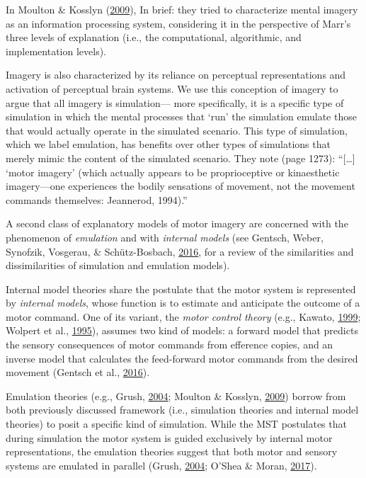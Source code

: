 \documentclass[a4paper,12pt,twoside,openright,oldfontcommands]{memoir}
\begin{document}
In Moulton \& Kosslyn
(\protect\hyperlink{ref-moulton_imagining_2009}{2009}), In brief: they
tried to characterize mental imagery as an information processing
system, considering it in the perspective of Marr's three levels of
explanation (i.e., the computational, algorithmic, and implementation
levels).

Imagery is also characterized by its reliance on perceptual
representations and activation of perceptual brain systems. We use this
conception of imagery to argue that all imagery is simulation--- more
specifically, it is a specific type of simulation in which the mental
processes that `run' the simulation emulate those that would actually
operate in the simulated scenario. This type of simulation, which we
label emulation, has benefits over other types of simulations that
merely mimic the content of the simulated scenario. They note (page
1273): ``{[}\ldots{}{]} `motor imagery' (which actually appears to be
proprioceptive or kinaesthetic imagery---one experiences the bodily
sensations of movement, not the movement commands themselves: Jeannerod,
1994).''

A second class of explanatory models of motor imagery are concerned with
the phenomenon of \emph{emulation} and with \emph{internal models} (see
Gentsch, Weber, Synofzik, Vosgerau, \& Schütz-Bosbach,
\protect\hyperlink{ref-gentsch_towards_2016}{2016}, for a review of the
similarities and dissimilarities of simulation and emulation models).

Internal model theories share the postulate that the motor system is
represented by \emph{internal models}, whose function is to estimate and
anticipate the outcome of a motor command. One of its variant, the
\emph{motor control theory} (e.g., Kawato,
\protect\hyperlink{ref-kawato_internal_1999}{1999}; Wolpert et al.,
\protect\hyperlink{ref-wolpert_internal_1995}{1995}), assumes two kind
of models: a forward model that predicts the sensory consequences of
motor commands from efference copies, and an inverse model that
calculates the feed-forward motor commands from the desired movement
(Gentsch et al., \protect\hyperlink{ref-gentsch_towards_2016}{2016}).

Emulation theories (e.g., Grush,
\protect\hyperlink{ref-grush_emulation_2004}{2004}; Moulton \& Kosslyn,
\protect\hyperlink{ref-moulton_imagining_2009}{2009}) borrow from both
previously discussed framework (i.e., simulation theories and internal
model theories) to posit a specific kind of simulation. While the MST
postulates that during simulation the motor system is guided exclusively
by internal motor representations, the emulation theories suggest that
both motor and sensory systems are emulated in parallel (Grush,
\protect\hyperlink{ref-grush_emulation_2004}{2004}; O'Shea \& Moran,
\protect\hyperlink{ref-oshea_does_2017}{2017}).
\end{document}
